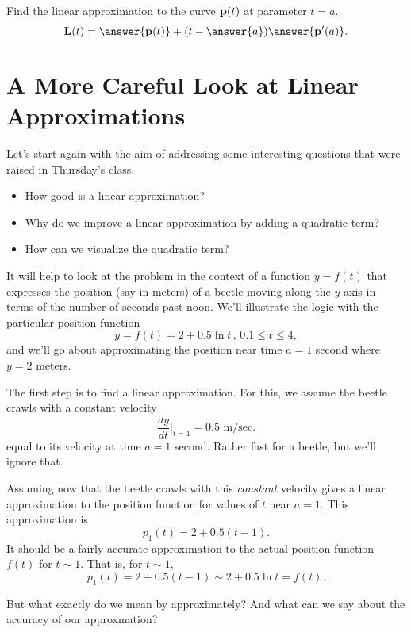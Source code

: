 \documentclass{ximera}
\begin{document}
\begin{question}  \label{Qfdgtyy}
Find the linear approximation to the curve ${\bf p}(t)$ at parameter $t=a$.
\[
     {\bf L} (t) = \answer{{\bf p}(t)} +   (t - \answer{a} )\answer{{\bf p}^\prime(a)}  .
\]
\end{question}




\section{A More Careful Look at Linear Approximations}
Let's start again with the aim of addressing some interesting questions that were raised in Thursday's class.

\begin{itemize}

\item{How good is a linear approximation?}

\item{Why do we improve a linear approximation by adding a quadratic term?}

\item{How can we visualize the quadratic term?}

\end{itemize}

It will help to look at the problem in the context of a function $y=f(t)$ that expresses the position (say in meters) of a beetle moving along the $y$-axis in terms of the number of seconds past noon. We'll illustrate the logic with the particular position function
\[
     y = f(t) = 2 + 0.5\ln t \, ,  \, 0.1 \leq t \leq 4 ,
\]
and we'll go about approximating the position near time $a=1$ second where $y=2$ meters.

The first step is to find a linear approximation. For this, we assume the beetle crawls with a constant velocity 
\[
   \frac{dy}{dt} \Big|_{t=1} = 0.5 \text{ m/sec} .
\]
equal to its velocity at time $a=1$ second. Rather fast for a beetle, but we'll ignore that.

Assuming now that the beetle crawls with this \emph{constant} velocity gives a linear approximation to the position function for values of $t$ near $a=1$. This approximation is
\[
    p_1(t) = 2 + 0.5(t-1) .
\]
It should be a fairly accurate approximation to the actual position function $f(t)$ for $t\sim 1$. That is, for $t\sim 1$,
\[
       p_1(t) = 2 + 0.5(t-1) \sim 2 + 0.5 \ln t = f(t).
\]

But what exactly do we mean by approximately? And what can we say about the accuracy of our approxmation?
\end{document}
